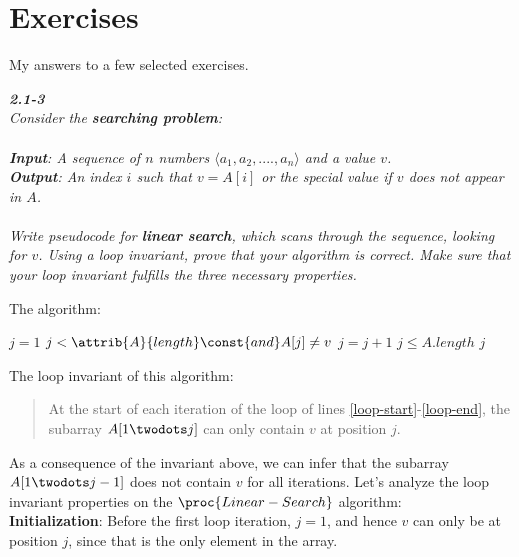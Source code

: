 \documentclass[8pt,a4paper]{article}
\begin{document}
\section*{Exercises}
My answers to a few selected exercises.

\begin{framed}
\textbf{\textit{2.1-3}} \\
\textit{Consider the \textbf{searching problem}: \\
\\
\textbf{Input}: A sequence of $n$ numbers $\langle a_1, a_2, ...., a_n \rangle$ and a value $v$. \\
\textbf{Output}: An index $i$ such that $v = A[i]$ or the special value  if $v$
does not appear in $A$. \\
\\
Write pseudocode for \textbf{linear search}, which scans through the sequence, looking
for $v$. Using a loop invariant, prove that your algorithm is correct. Make sure
that your loop invariant fulfills the three necessary properties.}
\end{framed}

The algorithm:

\begin{codebox}
  \li $j = 1$
  \li \While $j < \attrib{A}{length} \const{and} A[j] \neq v$     \label{loop-start}
        \Do
  \li     $j = j + 1$
  \End                                                            \label{loop-end}
  \li \If $j \leq A.length$
        \Then
  \li     \Return $j$
  \li   \Else
  \li     \Return {}
        \End
\end{codebox}

The loop invariant of this algorithm:

\begin{quotation}
  At the start of each iteration of the \While loop of lines \ref{loop-start}-\ref{loop-end},
  the subarray $A[1 \twodots j]$ can only contain $v$ at position $j$.
\end{quotation}

As a consequence of the invariant above, we can infer that the subarray $A[1 \twodots j-1]$
does not contain $v$ for all iterations. Let's analyze the loop invariant properties
on the $\proc{Linear-Search}$ algorithm: \\

\textbf{Initialization}: Before the first loop iteration, $j = 1$, and hence $v$ can only
be at position $j$, since that is the only element in the array. \\
\end{document}
